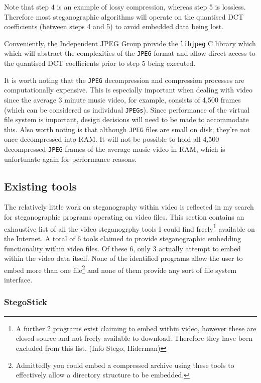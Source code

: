 \documentclass[paper=a4, fontsize=11pt,twoside]{scrartcl}    %
\begin{document}
\noindent
Note that step 4 is an example of lossy compression, whereas step 5 is lossless. Therefore most steganographic algorithms will operate on the quantised DCT coefficients (between steps 4 and 5) to avoid embedded data being lost.

Conveniently, the Independent JPEG Group provide the \texttt{libjpeg} C library which which will abstract the complexities of the \texttt{JPEG} format and allow direct access to the quantised DCT coefficients prior to step 5 being executed.

It is worth noting that the \texttt{JPEG} decompression and compression processes are computationally expensive. This is especially important when dealing with video since the average 3 minute music video, for example, consists of 4,500 frames (which can be considered as individual \texttt{JPEGs}). Since performance of the virtual file system is important, design decisions will need to be made to accommodate this. Also worth noting is that although \texttt{JPEG} files are small on disk, they're not once decompressed into RAM. It will not be possible to hold all 4,500 decompressed \texttt{JPEG} frames of the average music video in RAM, which is unfortunate again for performance reasons.

\subsection{Existing tools}
The relatively little work on steganography within video is reflected in my search for steganographic programs operating on video files. This section contains an exhaustive list of all the video steganogrphy tools I could find freely\footnote{A further 2 programs exist claiming to embed within video, however these are closed source and not freely available to download. Therefore they have been excluded from this list. (Info Stego, Hiderman)} available on the Internet. A total of 6 tools claimed to provide steganographic embedding functionality within video files. Of these 6, only 3 actually attempt to embed within the video data itself. None of the identified programs allow the user to embed more than one file\footnote{Admittedly you could embed a compressed archive using these tools to effectively allow a directory structure to be embedded.}  and none of them provide any sort of file system interface.

\subsubsection{StegoStick}
\end{document}
